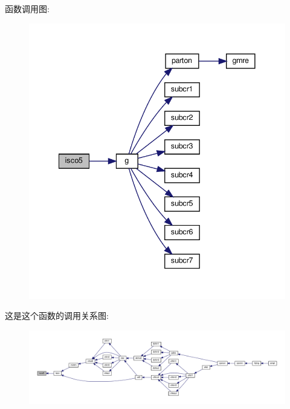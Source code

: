 函数调用图\+:
\nopagebreak
\begin{figure}[H]
\begin{center}
\leavevmode
\includegraphics[width=341pt]{isco5_8f90_adb61e2b9a02855f341b1ff319cf61aa8_cgraph}
\end{center}
\end{figure}
这是这个函数的调用关系图\+:
\nopagebreak
\begin{figure}[H]
\begin{center}
\leavevmode
\includegraphics[width=350pt]{isco5_8f90_adb61e2b9a02855f341b1ff319cf61aa8_icgraph}
\end{center}
\end{figure}
